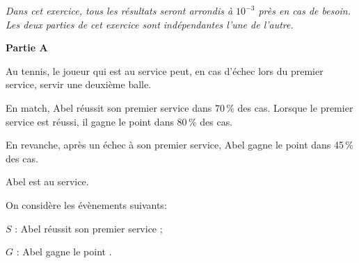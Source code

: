 \medskip

\emph{Dans cet exercice, tous les résultats seront arrondis à $10^{-3}$ près en cas de besoin.\\
Les deux parties de cet exercice sont indépendantes l'une de l'autre.}

\bigskip

\textbf{Partie A}

\medskip

Au tennis, le joueur qui est au service peut, en cas d'échec lors du premier service, servir une deuxième balle.

En match, Abel réussit son premier service dans 70\,\% des cas. Lorsque le premier service est réussi, il gagne le point dans 80\,\% des cas.

En revanche, après un échec à son premier service, Abel gagne
le point dans 45\,\% des cas.



Abel est au service.

\begin{list}{\textbullet}{On considère les évènements suivants:}
\item $S$ : \og Abel réussit son premier service \fg{};
\item $G$ : \og Abel gagne le point \fg.
\end{list}



